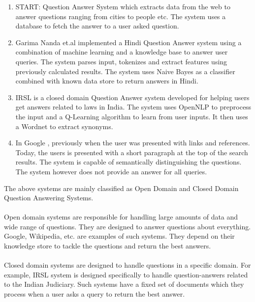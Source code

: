 \begin{enumerate}
\item 
START: Question Answer System \cite{katz1997annotating} which extracts data from the web to answer questions ranging from cities to people etc. The system uses a database to fetch the answer to a user asked question.

\item
Garima Nanda et.al implemented a Hindi Question Answer system \cite {nanda2016hindi} using a combination of machine learning and a knowledge base to answer user queries. The system parses input, tokenizes and extract features using previously calculated results. The system uses  Naive Bayes as a classifier combined with known data store to return answers in Hindi.

\item
IRSL \cite {sangeetha2017information} is a closed domain Question Answer system developed for helping users get answers related to laws in India. The system uses OpenNLP to preprocess the input and a Q-Learning algorithm to learn from user inputs. It then uses a Wordnet to extract synonyms.

\item 
In Google \cite {alupului2016question}, previously when the user was presented with links and references. Today, the users is presented with a short paragraph at the top of the search results. The system is capable of semantically distinguishing the questions. The system however does not provide an answer for all queries.

\end{enumerate}

The above systems are mainly classified as Open Domain and Closed Domain Question Answering Systems.

\paragraph{}
Open domain systems are responsible for handling large amounts of data and wide range of questions. They are designed to answer questions about everything. Google, Wikipedia, etc. are examples of such systems. They depend on their knowledge store to tackle the questions and return the best answers.

\paragraph{}
Closed domain systems are designed to handle questions in a specific domain. For example, IRSL system is designed specifically to handle question-answers related to the Indian Judiciary. Such systems have a fixed set of documents which they process when a user asks a query to return the best answer.

